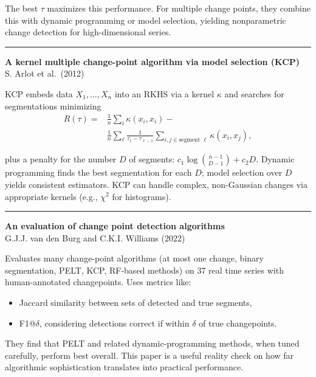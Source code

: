 \documentclass[a5paper]{article}
\providecommand{\tightlist}{%
  \setlength{\itemsep}{0pt}\setlength{\parskip}{0pt}}
\begin{document}
The best $\tau$ maximizes this performance. For multiple change points, they
combine this with dynamic programming or model selection, yielding
nonparametric change detection for high-dimensional series.

\begin{center}\rule{0.5\linewidth}{0.5pt}\end{center}

\textbf{A kernel multiple change-point algorithm via model selection
(KCP)}\\
S. Arlot et al.~(2012)

KCP embeds data $X_1,\ldots,X_n$ into an RKHS via a kernel $\kappa$ and searches
for segmentations minimizing
\begin{align*}
 R(\tau) = {}&
 \frac{1}{n} \sum_i \kappa(x_i,x_i) - {}\\
 & \frac{1}{n}
\sum_\ell \frac{1}{\tau_\ell-\tau_{\ell-1}} \sum_{i,j
\in \text{segment }\ell} \kappa(x_i,x_j),
\end{align*}

plus a penalty for the number $D$ of segments: $c_1\log\binom{n-1}{D-1} +
c_2D$. Dynamic programming finds the best segmentation for each $D$;
model selection over $D$ yields consistent estimators. KCP can handle
complex, non-Gaussian changes via appropriate kernels (e.g., $\chi^2$ for
histograms).

\begin{center}\rule{0.5\linewidth}{0.5pt}\end{center}

\textbf{An evaluation of change point detection algorithms}\\
G.J.J. van den Burg and C.K.I. Williams (2022)

Evaluates many change-point algorithms (at most one change, binary
segmentation, PELT, KCP, RF-based methods) on 37 real time series with
human-annotated changepoints. Uses metrics like:

\begin{itemize}
\tightlist
\item
  Jaccard similarity between sets of detected and true segments,
\item
  F1@$\delta$, considering detections correct if within $\delta$ of true changepoints.
\end{itemize}

They find that PELT and related dynamic-programming methods, when tuned
carefully, perform best overall. This paper is a useful reality check on
how far algorithmic sophistication translates into practical
performance.
\end{document}
